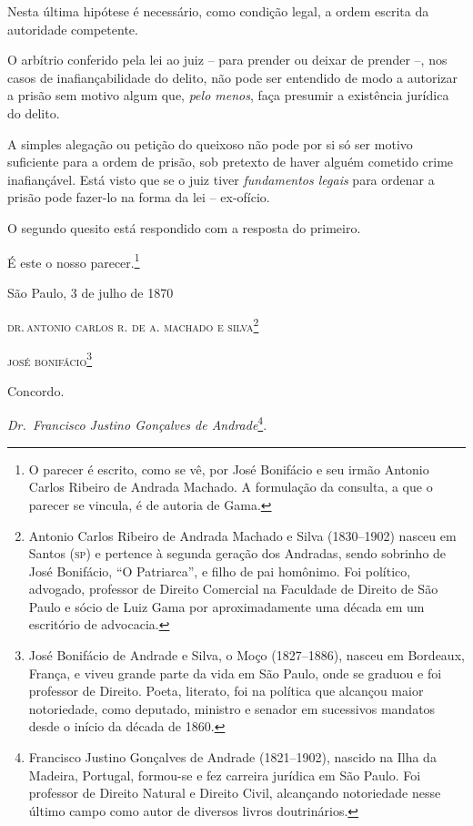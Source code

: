 Nesta última hipótese é necessário, como condição legal, a ordem escrita
da autoridade competente.

O arbítrio conferido pela lei ao juiz -- para prender ou deixar de
prender --, nos casos de inafiançabilidade do delito, não pode ser
entendido de modo a autorizar a prisão sem motivo algum que, \emph{pelo
menos}, faça presumir a existência jurídica do delito.

A simples alegação ou petição do queixoso não pode por si só ser motivo
suficiente para a ordem de prisão, sob pretexto de haver alguém cometido
crime inafiançável. Está visto que se o juiz tiver \emph{fundamentos
legais} para ordenar a prisão pode fazer-lo na forma da lei --
ex-ofício.

O segundo quesito está respondido com a resposta do primeiro.

É este o nosso parecer.\footnote{ O parecer é escrito, como se vê, por
  José Bonifácio e seu irmão Antonio Carlos Ribeiro de Andrada Machado.
  A formulação da consulta, a que o parecer se vincula, é de autoria de
  Gama.}

\begin{flushright}
São Paulo, 3 de julho de 1870

\textsc{dr.\,antonio carlos r. de a. machado e silva}\footnote{ Antonio
  Carlos Ribeiro de Andrada Machado e Silva (1830--1902) nasceu em Santos
  (\textsc{sp}) e pertence à segunda geração dos Andradas, sendo sobrinho de José
  Bonifácio, ``O Patriarca'', e filho de pai homônimo. Foi político,
  advogado, professor de Direito Comercial na Faculdade de Direito de
  São Paulo e sócio de Luiz Gama por aproximadamente uma década em um
  escritório de advocacia.}

\textsc{josé bonifácio}\footnote{ José Bonifácio de Andrade e Silva, o
  Moço (1827--1886), nasceu em Bordeaux, França, e viveu grande parte da
  vida em São Paulo, onde se graduou e foi professor de Direito. Poeta,
  literato, foi na política que alcançou maior notoriedade, como
  deputado, ministro e senador em sucessivos mandatos desde o início da
  década de 1860.}
\end{flushright}

Concordo.

\emph{Dr.~Francisco Justino Gonçalves de Andrade}\footnote{ Francisco
  Justino Gonçalves de Andrade (1821--1902), nascido na Ilha da Madeira,
  Portugal, formou-se e fez carreira jurídica em São Paulo. Foi
  professor de Direito Natural e Direito Civil, alcançando notoriedade
  nesse último campo como autor de diversos livros doutrinários.}.

